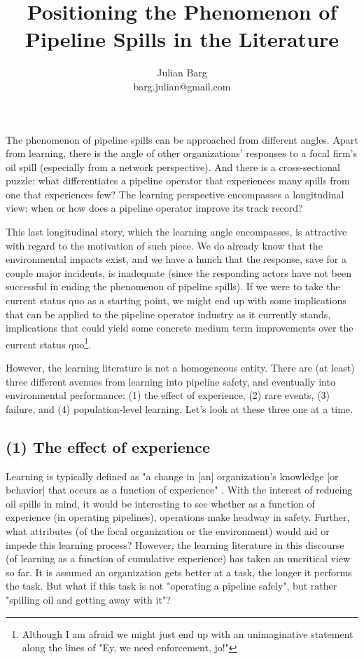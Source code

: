 \documentclass[12pt, man, natbib]{apa6}
\title{Positioning the Phenomenon of Pipeline Spills in the Literature}
\author{Julian Barg\\barg.julian@gmail.com}
\affiliation{Ivey Business School}
\begin{document}
	
	\maketitle
	
	\singlespacing
	
	\section{}	
	
	The phenomenon of pipeline spills can be approached from different angles. Apart from learning, there is the angle of other organizations' responses to a focal firm's oil spill (especially from a network perspective). And there is a cross-sectional puzzle: what differentiates a pipeline operator that experiences many spills from one that experiences few? The learning perspective encompasses a longitudinal view: when or how does a pipeline operator improve its track record? 
	
	This last longitudinal story, which the learning angle encompasses, is attractive with regard to the motivation of such piece. We do already know that the environmental impacts exist, and we have a hunch that the response, save for a couple major incidents, is inadequate (since the responding actors have not been successful in ending the phenomenon of pipeline spills). If we were to take the current status quo as a starting point, we might end up with some implications that can be applied to the pipeline operator industry as it currently stands, implications that could yield some concrete medium term improvements over the current status quo\footnote{Although I am afraid we might just end up with an unimaginative statement along the lines of "Ey, we need enforcement, jo!"}.
	
	However, the learning literature is not a homogeneous entity. There are (at least) three different avenues from learning into pipeline safety, and eventually into environmental performance: (1) the effect of experience, (2) rare events, (3) failure, and (4) population-level learning. Let's look at these three one at a time.
	
	\subsection{(1) The effect of experience}
	
	Learning is typically defined as "a change in [an] organization's knowledge [or behavior] that occurs as a function of experience" \citep[31]{Argote2013b}. With the interest of reducing oil spills in mind, it would be interesting to see whether as a function of experience (in operating pipelines), operations make headway in safety. Further, what attributes (of the focal organization or the environment) would aid or impede this learning process? However, the learning literature in this discourse (of learning as a function of cumulative experience) has taken an uncritical view so far. It is assumed an organization gets better at a task, the longer it performs the task. But what if this task is not "operating a pipeline safely", but rather "spilling oil and getting away with it"?
	
\end{document}
